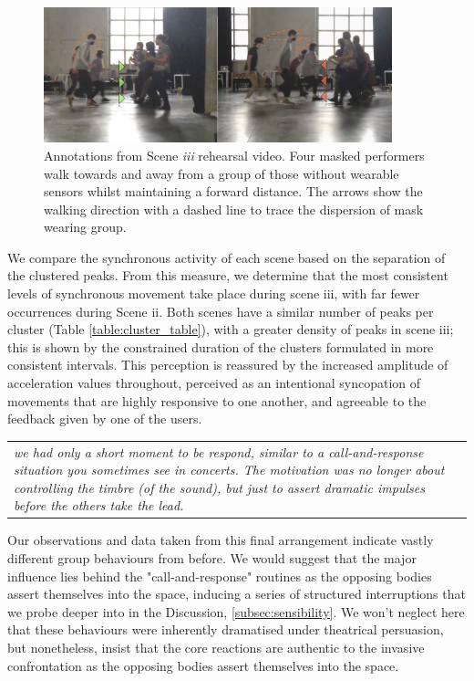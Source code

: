 \begin{figure}[!h]
\centering
\includegraphics[width=0.9\textwidth,keepaspectratio]{Chapters/Figures/adse_ess/scene_iii-merged-2.png}
{
\caption[Annotations from Scene \textit{iii} rehearsal video]{Annotations from Scene \textit{iii} rehearsal video. Four masked performers walk towards and away from a group of those without wearable sensors whilst maintaining a forward distance. The arrows show the walking direction with a dashed line to trace the dispersion of mask wearing group.
}
\label{fig:scene_iii_annotation}
}
\end{figure}

We compare the synchronous activity of each scene based on the separation of the clustered peaks. From this measure, we determine that the most consistent levels of synchronous movement take place during scene iii, with far fewer occurrences during Scene ii. Both scenes have a similar number of peaks per cluster (Table \ref{table:cluster_table}), with a greater density of peaks in scene iii; this is shown by the constrained duration of the clusters formulated in more consistent intervals. This perception is reassured by the increased amplitude of acceleration values throughout, perceived as an intentional syncopation of movements that are highly responsive to one another, and agreeable to the feedback given by one of the users.

\begin{center}
\begin{tabular}{ p{13cm}}
\textit{we had only a short moment to be respond, similar to a call-and-response situation you sometimes see in concerts. The motivation was no longer about controlling the timbre (of the sound), but just to assert dramatic impulses before the others take the lead.}
\end{tabular}
\end{center}

Our observations and data taken from this final arrangement indicate vastly different group behaviours from before. We would suggest that the major influence lies behind the "call-and-response" routines as the opposing bodies assert themselves into the space, inducing a series of structured interruptions that we probe deeper into in the Discussion, \ref{subsec:sensibility}. We won't neglect here that these behaviours were inherently dramatised under theatrical persuasion, but nonetheless, insist that the core reactions are authentic to the invasive confrontation as the opposing bodies assert themselves into the space.

